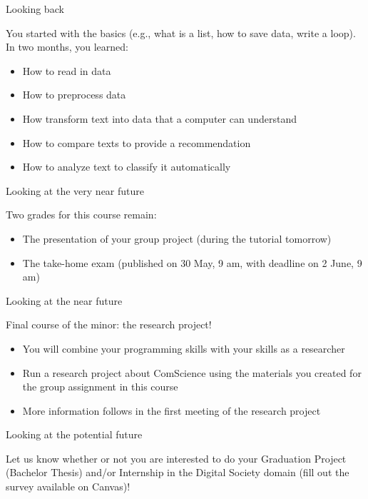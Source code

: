 \documentclass[handout]{beamer}
\begin{document}
\begin{frame}{Looking back} 
	
You started with the basics (e.g., what is a list, how to save data, write a loop).\\
In two months, you learned:
	\begin{itemize}
		\item How to read in data
		\item How to preprocess data
		\item How transform text into data that a computer can understand
		\item How to compare texts to provide a recommendation
		\item How to analyze text to classify it automatically
	
	\end{itemize}
	
\end{frame}


\begin{frame}{Looking at the very near future} 
	
Two grades for this course remain:
	\begin{itemize}
		\item The presentation of your group project (during the tutorial tomorrow)
		\item The take-home exam (published on 30 May, 9 am, with deadline on 2 June, 9 am)
	\end{itemize}
	
\end{frame}

\begin{frame}{Looking at the near future} 
	
Final course of the minor: the research project!
\begin{itemize}
		\item You will combine your programming skills with your skills as a researcher
		\item Run a research project about ComScience using the materials you created for the group assignment in this course
		\item More information follows in the first meeting of the research project
\end{itemize}
\end{frame}


\begin{frame}{Looking at the potential future} 
	
Let us know whether or not you are interested to do your Graduation Project (Bachelor Thesis) and/or Internship in the Digital Society domain (fill out the survey available on Canvas)!

\end{frame}
\end{document}
